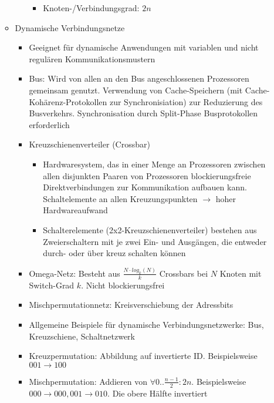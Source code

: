 \begin{itemize}
\begin{itemize}
\begin{itemize}
\begin{itemize}
				\item Knoten-/Verbindungsgrad: \(2n\)
			\end{itemize}
		\end{itemize}
		\item Dynamische Verbindungsnetze
		\begin{itemize}
			\item Geeignet für dynamische Anwendungen mit variablen und nicht regulären Kommunikationsmustern
			\item Bus: Wird von allen an den Bus angeschlossenen Prozessoren gemeinsam genutzt. Verwendung von Cache-Speichern (mit Cache-Kohärenz-Protokollen zur Synchronisiation) zur Reduzierung des Busverkehrs. Synchronisation durch Split-Phase Busprotokollen erforderlich
			\item Kreuzschienenverteiler (Crossbar)
			\begin{itemize}
				\item Hardwaresystem, das in einer Menge an Prozessoren zwischen allen disjunkten Paaren von Prozessoren blockierungsfreie Direktverbindungen zur Kommunikation aufbauen kann. Schaltelemente an allen Kreuzungspunkten \(\rightarrow\) hoher Hardwareaufwand
				\item Schalterelemente (2x2-Kreuzschienenverteiler) bestehen aus Zweierschaltern mit je zwei Ein- und Ausgängen, die entweder durch- oder über kreuz schalten können
			\end{itemize}
			\item Omega-Netz: Besteht aus \(\frac{N\cdot log_k(N)}{k}\) Crossbars bei \(N\) Knoten mit Switch-Grad \(k\). Nicht blockierungsfrei
			\item Mischpermutationnetz: Kreisverschiebung der Adressbits
			\item Allgemeine Beispiele für dynamische Verbindungsnetzwerke: Bus, Kreuzschiene, Schaltnetzwerk
			\item Kreuzpermutation: Abbildung auf invertierte ID. Beispielsweise \(001 \longrightarrow 100\)
			\item Mischpermutation: Addieren von \(\forall 0..\frac{n-1}{2}:2n\). Beispielsweise \(000 \longrightarrow 000, 001 \longrightarrow 010\). Die obere Hälfte invertiert
		\end{itemize}
	\end{itemize}
\end{itemize}


